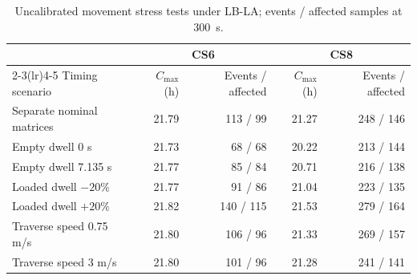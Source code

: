 \begin{table}[tbp]
\caption{Uncalibrated movement stress tests under LB-LA; events / affected samples at 300~s.\label{tab:physical}}
\centering
\footnotesize
\setlength{\tabcolsep}{3pt}
\begin{tabular*}{\textwidth}{@{\extracolsep{\fill}}lrrrr@{}}
\toprule
 & \multicolumn{2}{c}{CS6} & \multicolumn{2}{c}{CS8}\\\cmidrule(lr){2-3}\cmidrule(lr){4-5} Timing scenario & $C_{\max}$ (h) & Events / affected & $C_{\max}$ (h) & Events / affected\\
\midrule
Separate nominal matrices & 21.79 & 113 / 99 & 21.27 & 248 / 146\\
Empty dwell 0 s & 21.73 & 68 / 68 & 20.22 & 213 / 144\\
Empty dwell 7.135 s & 21.77 & 85 / 84 & 20.71 & 216 / 138\\
Loaded dwell $-20\%$ & 21.77 & 91 / 86 & 21.04 & 223 / 135\\
Loaded dwell $+20\%$ & 21.82 & 140 / 115 & 21.53 & 279 / 164\\
Traverse speed 0.75 m/s & 21.80 & 106 / 96 & 21.33 & 269 / 157\\
Traverse speed 3 m/s & 21.80 & 101 / 96 & 21.28 & 241 / 141\\
\bottomrule
\end{tabular*}
\end{table}
